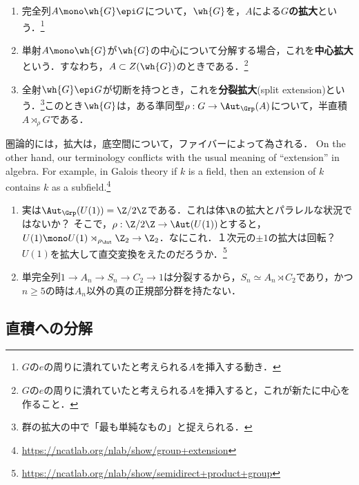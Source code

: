\documentclass[uplatex,dvipdfmx]{jsreport}
\begin{document}
\begin{definition}\mbox{}
    \begin{enumerate}
        \item 完全列$A\mono\wh{G}\epi G$について，$\wh{G}$を，$A$による\textbf{$G$の拡大}という．\footnote{$G$の$e$の周りに潰れていたと考えられる$A$を挿入する動き．}
        \item 単射$A\mono\wh{G}$が$\wh{G}$の中心について分解する場合，これを\textbf{中心拡大}という．すなわち，$A\subset Z(\wh{G})$のときである．\footnote{$G$の$e$の周りに潰れていたと考えられる$A$を挿入すると，これが新たに中心を作ること．}
        \item 全射$\wh{G}\epi G$が切断を持つとき，これを\textbf{分裂拡大}(split extension)という．\footnote{群の拡大の中で「最も単純なもの」と捉えられる．}このとき$\wh{G}$は，ある準同型$\rho:G\to\Aut_\Grp(A)$について，半直積$A\rtimes_\rho G$である．
    \end{enumerate}
\end{definition}
\begin{remark}[拡大とはファイバーである]
    圏論的には，拡大は，底空間について，ファイバーによって為される．
    On the other hand, our terminology conflicts with the usual meaning of “extension” in algebra. For example, in Galois theory if $k$ is a field, then an extension of $k$ contains $k$ as a subfield.\footnote{\url{https://ncatlab.org/nlab/show/group+extension}}
\end{remark}
\begin{example}\mbox{}\label{example-extension}
    \begin{enumerate}
        \item 実は$\Aut_\Grp(U(1))=\Z/2\Z$である．これは体$\R$の拡大とパラレルな状況ではないか？
        そこで，$\rho:\Z/2\Z\to\Aut(U(1))$とすると，
        $U(1)\mono U(1)\rtimes_{\rho_\Aut}\Z_2\to\Z_2$．なにこれ．１次元の$\pm 1$の拡大は回転？
        $U(1)$を拡大して直交変換をえたのだろうか．\footnote{\url{https://ncatlab.org/nlab/show/semidirect+product+group}}
        \item 単完全列$1\to A_n\to S_n\to C_2\to 1$は分裂するから，$S_n\simeq A_n\rtimes C_2$であり，かつ$n\ge 5$の時は$A_n$以外の真の正規部分群を持たない．
    \end{enumerate}
\end{example}

\subsection{直積への分解}
\end{document}
